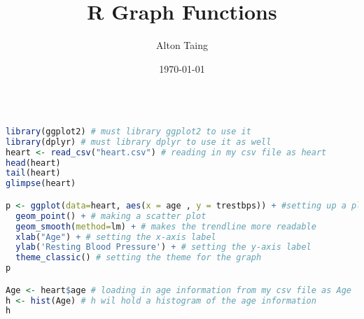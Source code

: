 \documentclass[letterpaper]{article}
\title{R Graph Functions}
\author{Alton Taing}
\date{\today}
\begin{document}
\maketitle

\begin{lstlisting}[language=R]

library(ggplot2) # must library ggplot2 to use it
library(dplyr) # must library dplyr to use it as well
heart <- read_csv("heart.csv") # reading in my csv file as heart
head(heart)
tail(heart)
glimpse(heart)

p <- ggplot(data=heart, aes(x = age , y = trestbps)) + #setting up a plot using age and resting blood pressure
  geom_point() + # making a scatter plot
  geom_smooth(method=lm) + # makes the trendline more readable
  xlab("Age") + # setting the x-axis label
  ylab('Resting Blood Pressure') + # setting the y-axis label
  theme_classic() # setting the theme for the graph
p

Age <- heart$age # loading in age information from my csv file as Age
h <- hist(Age) # h wil hold a histogram of the age information
h
    
\end{lstlisting}
\end{document}
